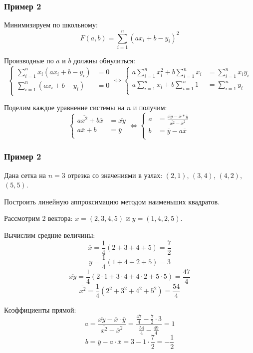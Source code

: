\documentclass[10pt]{beamer}
\begin{document}
\begin{frame}[fragile]
\frametitle{Пример 2}

Минимизируем по школьному:
$$F(a,b) = \sum_{i=1}^n (a x_i + b - y_i)^2$$

Производные по $a$ и $b$ должны обнулиться:
$$
\begin{cases}
\sum_{i=1}^n x_i (a x_i + b - y_i) &= 0\\
\sum_{i=1}^n (a x_i + b - y_i) &= 0\\
\end{cases}
\Leftrightarrow
\begin{cases}
a \sum_{i=1}^n x_i^2 + b \sum_{i=1}^n x_ i &= \sum_{i=1}^n x_i y_i \\
a \sum_{i=1}^n x_i + b \sum_{i=1}^n 1 &= \sum_{i=1}^n y_i\\
\end{cases}
$$

Поделим каждое уравнение системы на $n$ и получим: 
\begin{equation}
\begin{cases}
a \overline{x^2} + b \overline{x} &= \overline{x y} \\
a \overline{x} + b &= \overline{y}\\
\end{cases}
\Leftrightarrow
\begin{cases}
a &= \frac{\overline{x y} - \overline{x} *  \overline{y}}{\overline{x^2} - \overline{x}^2} \\
b &= \overline{y} - a \overline{x}\\
\end{cases}
\end{equation}
\end{frame}


\begin{frame}[fragile]
\frametitle{Пример 2}

Дана сетка на $n=3$ отрезка со значениями в узлах: $(2, 1)$, $(3, 4)$, $(4, 2)$, $(5, 5)$.

Построить линейную аппроксимацию методом наименьших квадратов. 

Рассмотрим 2 вектора: $x = ( 2, 3, 4, 5 )$ и $y = (1, 4, 2, 5)$.

Вычислим средние величины:
$$
\overline{x} = \frac{1}{4} \left(2 + 3 + 4 + 5 \right) = \frac{7}{2}
$$
$$
\overline{y} = \frac{1}{4} (1 + 4 + 2 + 5) = 3
$$
$$
\overline{x y} = \frac{1}{4} \left( 2 \cdot 1 + 3 \cdot 4 + 4 \cdot 2 + 5 \cdot 5 \right) = \frac{47}{4}
$$
$$
\overline{x^2} = \frac{1}{4} \left(2^2 + 3^2 + 4^2 + 5^2 \right) = \frac{54}{4}
$$

Коэффициенты прямой:
$$
a = \frac{\overline{x y} - \overline{x} \cdot \overline{y}}{\overline{x^2} - \overline{x}^2} = \frac{ \frac{47}{4} - \frac{7}{2}  \cdot 3 }{ \frac{54}{4} - \frac{49}{4}} = 1
$$
$$
b = \overline{y} - a  \cdot \overline{x} = 3 - 1 \cdot \frac{7}{2} = -\frac{1}{2}
$$
\end{frame}
\end{document}
